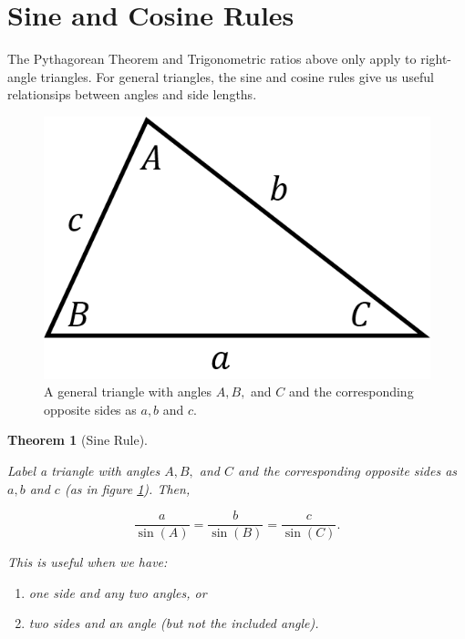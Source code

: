 \documentclass[
]{book}
\providecommand{\tightlist}{%
  \setlength{\itemsep}{0pt}\setlength{\parskip}{0pt}}
\newtheorem{theorem}{Theorem}[chapter]
\theoremstyle{definition}
\theoremstyle{definition}
\theoremstyle{definition}
\theoremstyle{definition}
\theoremstyle{remark}
\begin{document}
\hypertarget{sine-and-cosine-rules}{%
\section{Sine and Cosine Rules}\label{sine-and-cosine-rules}}

The Pythagorean Theorem and Trigonometric ratios above only apply to right-angle triangles. For general triangles, the sine and cosine rules give us useful relationsips between angles and side lengths.

\begin{figure}
\includegraphics{figures/triangle} \caption{A general triangle with angles $A, B,$ and $C$ and the corresponding opposite sides as $a, b$ and $c$.}\label{fig:tri}
\end{figure}

\begin{theorem}[Sine Rule]
\protect\hypertarget{thm:sinerule}{}\label{thm:sinerule}

Label a triangle with angles \(A, B,\) and \(C\) and the corresponding opposite sides as \(a, b\) and \(c\) (as in figure \ref{fig:tri}). Then,

\[\frac{a}{\sin(A)}=\frac{b}{\sin(B)}=\frac{c}{\sin(C)}.\]

This is useful when we have:

\begin{enumerate}
\def\labelenumi{\arabic{enumi}.}
\tightlist
\item
  one side and any two angles, or
\item
  two sides and an angle (but not the included angle).
\end{enumerate}

\end{theorem}
\end{document}
